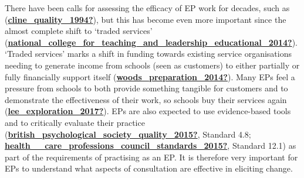 \documentclass[
]{article}
\begin{document}
There have been calls for assessing the efficacy of EP work for decades,
such as
(\protect\hyperlink{ref-cline_quality_1994}{\textbf{cline\_quality\_1994?}}),
but this has become even more important since the almost complete shift
to `traded services'
(\protect\hyperlink{ref-national_college_for_teaching_and_leadership_educational_2014}{\textbf{national\_college\_for\_teaching\_and\_leadership\_educational\_2014?}}).
`Traded services' marks a shift in funding towards existing service
organisations needing to generate income from schools (seen as
customers) to either partially or fully financially support itself
(\protect\hyperlink{ref-woods_preparation_2014}{\textbf{woods\_preparation\_2014?}}).
Many EPs feel a pressure from schools to both provide something tangible
for customers and to demonstrate the effectiveness of their work, so
schools buy their services again
(\protect\hyperlink{ref-lee_exploration_2017}{\textbf{lee\_exploration\_2017?}}).
EPs are also expected to use evidence-based tools and to critically
evaluate their practice
(\protect\hyperlink{ref-british_psychological_society_quality_2015}{\textbf{british\_psychological\_society\_quality\_2015?}},
Standard 4.8;
\protect\hyperlink{ref-health__care_professions_council_standards_2015}{\textbf{health\_\_care\_professions\_council\_standards\_2015?}},
Standard 12.1) as part of the requirements of practising as an EP. It is
therefore very important for EPs to understand what aspects of
consultation are effective in eliciting change.
\end{document}
